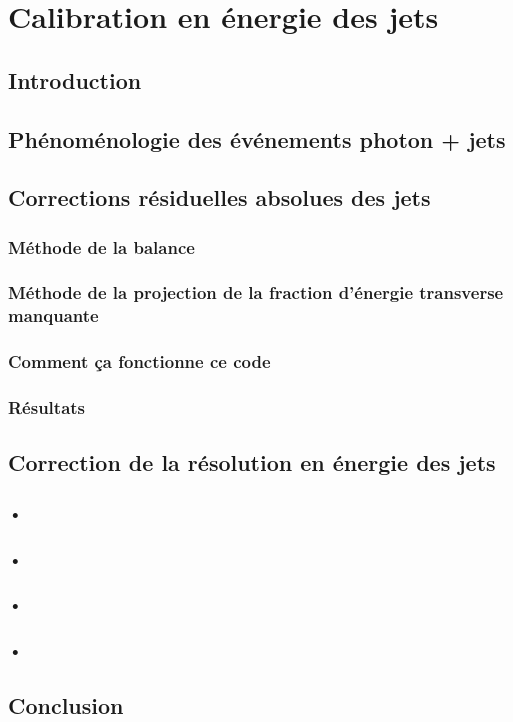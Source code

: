 \chapter{Calibration en énergie des jets}

\section{Introduction}

\section{Phénoménologie des événements photon + jets}

\section{Corrections résiduelles absolues des jets}

\subsection{Méthode de la balance}

\subsection{Méthode de la projection de la fraction d'énergie transverse manquante}

\subsection{\og Comment ça fonctionne ce code \fg{} }

\subsection{Résultats}

\section{Correction de la résolution en énergie des jets}

\subsection{•}
\subsection{•}
\subsection{•}
\subsection{•}

\section{Conclusion}
